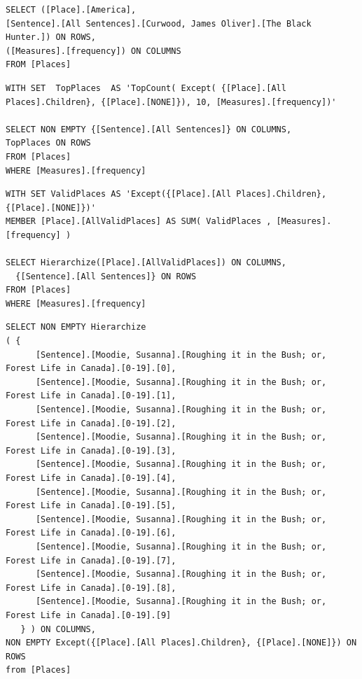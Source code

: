 \begin{lstlisting}[label=lst:tuplequery,caption=MDX query for obtaining a single tuple]
SELECT ([Place].[America], 
[Sentence].[All Sentences].[Curwood, James Oliver].[The Black Hunter.]) ON ROWS, 
([Measures].[frequency]) ON COLUMNS 
FROM [Places] 
\end{lstlisting}

\begin{lstlisting}[label=lst:topplacesquery,caption=MDX query to obtain top 10 occurring places]
WITH SET  TopPlaces  AS 'TopCount( Except( {[Place].[All Places].Children}, {[Place].[NONE]}), 10, [Measures].[frequency])'

SELECT NON EMPTY {[Sentence].[All Sentences]} ON COLUMNS,
TopPlaces ON ROWS 
FROM [Places]
WHERE [Measures].[frequency]
\end{lstlisting}

\begin{lstlisting}[label=lst:validplacesquery,caption=MDX query to obtain total number of occurrences of places]
WITH SET ValidPlaces AS 'Except({[Place].[All Places].Children}, {[Place].[NONE]})'
MEMBER [Place].[AllValidPlaces] AS SUM( ValidPlaces , [Measures].[frequency] )

SELECT Hierarchize([Place].[AllValidPlaces]) ON COLUMNS,
  {[Sentence].[All Sentences]} ON ROWS
FROM [Places]
WHERE [Measures].[frequency]
\end{lstlisting}

\begin{lstlisting}[label=lst:setquery,caption=MDX Query for a set]
SELECT NON EMPTY Hierarchize
( {
      [Sentence].[Moodie, Susanna].[Roughing it in the Bush; or, Forest Life in Canada].[0-19].[0], 
      [Sentence].[Moodie, Susanna].[Roughing it in the Bush; or, Forest Life in Canada].[0-19].[1], 
      [Sentence].[Moodie, Susanna].[Roughing it in the Bush; or, Forest Life in Canada].[0-19].[2], 
      [Sentence].[Moodie, Susanna].[Roughing it in the Bush; or, Forest Life in Canada].[0-19].[3], 
      [Sentence].[Moodie, Susanna].[Roughing it in the Bush; or, Forest Life in Canada].[0-19].[4], 
      [Sentence].[Moodie, Susanna].[Roughing it in the Bush; or, Forest Life in Canada].[0-19].[5], 
      [Sentence].[Moodie, Susanna].[Roughing it in the Bush; or, Forest Life in Canada].[0-19].[6], 
      [Sentence].[Moodie, Susanna].[Roughing it in the Bush; or, Forest Life in Canada].[0-19].[7], 
      [Sentence].[Moodie, Susanna].[Roughing it in the Bush; or, Forest Life in Canada].[0-19].[8], 
      [Sentence].[Moodie, Susanna].[Roughing it in the Bush; or, Forest Life in Canada].[0-19].[9]
   } ) ON COLUMNS, 
NON EMPTY Except({[Place].[All Places].Children}, {[Place].[NONE]}) ON ROWS
from [Places]
\end{lstlisting}







